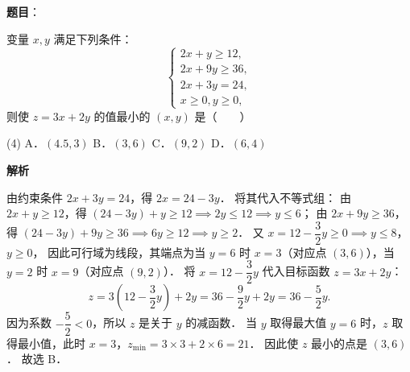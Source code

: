 \begin{answer}

\textbf{题目}：

变量 $x, y$ 满足下列条件：
\nopagebreak[4]
\[
\begin{cases}
2x + y \geqslant 12, \\
2x + 9y \geqslant 36, \\
2x + 3y = 24, \\
x \geqslant 0, y \geqslant 0,
\end{cases}
\]
则使 $z = 3x + 2y$ 的值最小的 $(x, y)$ 是\mbox{（　　）}

\begin{gkopts}(4)
\task A．$(4.5, 3)$
\task B．$(3, 6)$
\task C．$(9, 2)$
\task D．$(6, 4)$
\end{gkopts}

\textbf{解析}

由约束条件 $2x + 3y = 24$，得 $2x = 24 - 3y$．
将其代入不等式组：
由 $2x + y \geqslant 12$，得 $(24 - 3y) + y \geqslant 12 \implies 2y \leqslant 12 \implies y \leqslant 6$；
由 $2x + 9y \geqslant 36$，得 $(24 - 3y) + 9y \geqslant 36 \implies 6y \geqslant 12 \implies y \geqslant 2$．
又 $x = 12 - \dfrac{3}{2}y \geqslant 0 \implies y \leqslant 8$，$y \geqslant 0$，
因此可行域为线段，其端点为当 $y = 6$ 时 $x = 3$（对应点 $(3, 6)$），当 $y = 2$ 时 $x = 9$（对应点 $(9, 2)$）．
将 $x = 12 - \dfrac{3}{2}y$ 代入目标函数 $z = 3x + 2y$：
\nopagebreak[4]
\[
z = 3\left(12 - \dfrac{3}{2}y\right) + 2y = 36 - \dfrac{9}{2}y + 2y = 36 - \dfrac{5}{2}y.
\]
因为系数 $-\dfrac{5}{2} < 0$，所以 $z$ 是关于 $y$ 的减函数．
当 $y$ 取得最大值 $y = 6$ 时，$z$ 取得最小值，此时 $x = 3$，$z_{\min} = 3 \times 3 + 2 \times 6 = 21$．
因此使 $z$ 最小的点是 $(3, 6)$．
故选 B．


\end{answer}
